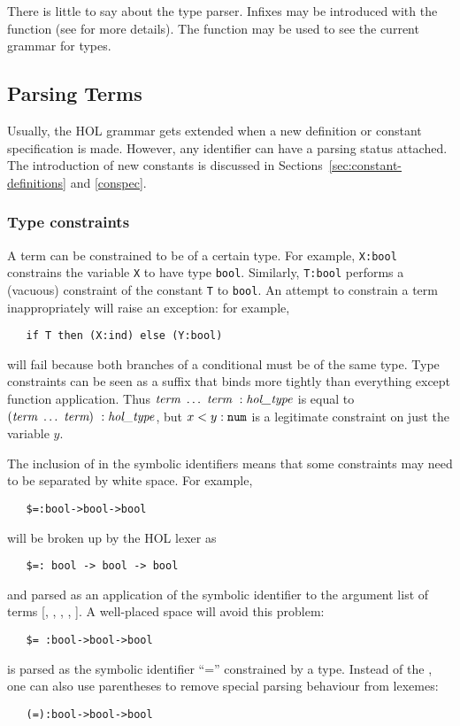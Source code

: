 {There is little to say about the type parser. Infixes may be
introduced with the function  (see \REFERENCE{}
for more details).  The function  may be used to
see the current grammar for types.

\subsection{Parsing Terms}

Usually, the HOL grammar gets extended when a new definition or
constant specification is made. However, any identifier can have a
parsing status attached. The introduction of new constants is
discussed in Sections~\ref{sec:constant-definitions} and
\ref{conspec}.


\subsubsection{Type constraints}

A term can be constrained to be of a certain type.  For example,
\verb+X:bool+ constrains the variable \verb+X+ to have type
\verb+bool+. Similarly, \verb+T:bool+ performs a (vacuous) constraint
of the constant \verb+T+ to \verb+bool+. An attempt to constrain a
term inappropriately will raise an exception: for example,
\begin{verbatim}
   if T then (X:ind) else (Y:bool)
\end{verbatim}
will fail because both branches of a conditional must be of the same
type.  Type constraints can be seen as a suffix that binds more
tightly than everything except function application.  Thus $\mbox{\it term}\
\ldots\ \mbox{\it term} \ : \mbox{\it hol\_type}$ is equal to $(\mbox{\it term}\ \ldots\ \mbox{\it term})\ :
\mbox{\it hol\_type}$, but $x < y:\holtxt{num}$ is a legitimate constraint on just
the variable $y$.

The inclusion of \holtxt{:} in the symbolic identifiers means that some
constraints may need to be separated by white space. For example,
\begin{verbatim}
   $=:bool->bool->bool
\end{verbatim}
will be broken up by the HOL lexer as
\begin{verbatim}
   $=: bool -> bool -> bool
\end{verbatim}
and parsed as an application of the symbolic identifier \holtxt{\$=:} to
the argument list of terms [, \holtxt{->}, \holtxt{bool},
\holtxt{->}, \holtxt{bool}]. A well-placed space will avoid this problem:
\begin{verbatim}
   $= :bool->bool->bool
\end{verbatim}
is parsed as the symbolic identifier ``='' constrained by a type.
Instead of the \holtxt{\$}, one can also use parentheses to remove
special parsing behaviour from lexemes:
\begin{verbatim}
   (=):bool->bool->bool
\end{verbatim}

}
